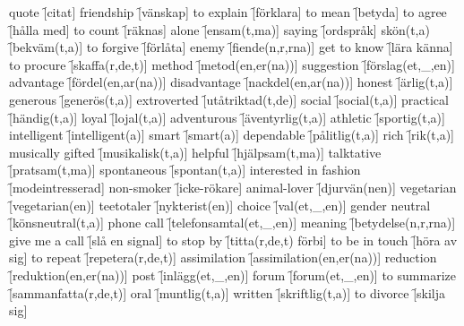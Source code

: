 \begin{questions}
    \begin{multicols}{2}
        \raggedcolumns
        \question quote \f[citat]
        \question friendship \f[vänskap]
        \question to explain \f[förklara]
        \question to mean \f[betyda]
        \question to agree \f[hålla med]
        \question to count \f[räknas]
        \question alone \f[ensam(t,ma)]
        \question saying \f[ordspråk]
        \question skön(t,a) \f[bekväm(t,a)]
        \question to forgive \f[förlåta]
        \question enemy \f[fiende(n,r,rna)]
        \question get to know \f[lära känna]
        \question to procure \f[skaffa(r,de,t)]
        \question method \f[metod(en,er(na))]
        \question suggestion \f[förslag(et,\_,en)]
        \question advantage \f[fördel(en,ar(na))]
        \question disadvantage \f[nackdel(en,ar(na))]
        \question honest \f[ärlig(t,a)]
        \question generous \f[generös(t,a)]
        \question extroverted \f[utåtriktad(t,de)]
        \question social \f[social(t,a)]
        \question practical \f[händig(t,a)]
        \question loyal \f[lojal(t,a)]
        \question adventurous \f[äventyrlig(t,a)]
        \question athletic \f[sportig(t,a)]
        \question intelligent \f[intelligent(a)]
        \question smart \f[smart(a)]
        \question dependable \f[pålitlig(t,a)]
        \question rich \f[rik(t,a)]
        \question musically gifted \f[musikalisk(t,a)]
        \question helpful \f[hjälpsam(t,ma)]
        \question talktative \f[pratsam(t,ma)]
        \question spontaneous \f[spontan(t,a)]
        \question interested in fashion \f[modeintresserad]
        \question non-smoker \f[icke-rökare]
        \question animal-lover \f[djurvän(nen)]
        \question vegetarian \f[vegetarian(en)]
        \question teetotaler \f[nykterist(en)]
        \question choice \f[val(et,\_,en)]
        \question gender neutral \f[könsneutral(t,a)]
        \question phone call \f[telefonsamtal(et,\_,en)]
        \question meaning \f[betydelse(n,r,rna)]
        \question give me a call \f[slå en signal]
        \question to stop by \f[titta(r,de,t) förbi]
        \question to be in touch \f[höra av sig]
        \question to repeat \f[repetera(r,de,t)]
        \question assimilation \f[assimilation(en,er(na))]
        \question reduction \f[reduktion(en,er(na))]
        \question post \f[inlägg(et,\_,en)]
        \question forum \f[forum(et,\_,en)]
        \question to summarize \f[sammanfatta(r,de,t)]
        \question oral \f[muntlig(t,a)]
        \question written \f[skriftlig(t,a)]
        \question to divorce \f[skilja sig]

\end{multicols}
\end{questions}
